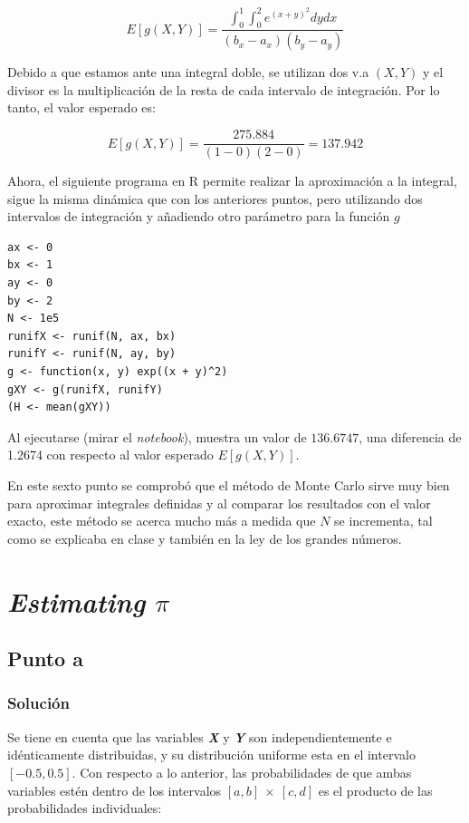 \documentclass[12pt]{article}
\begin{document}
\[
E[g(X, Y)] = \frac{\int_{0}^{1} \int_{0}^{2} e^{(x + y)^{2}} dydx}{(b_{x} - a_{x}) (b_{y} - a_{y})}
\]

Debido a que estamos ante una integral doble, se utilizan dos v.a $(X, Y)$ y el divisor es la multiplicación de la resta de cada intervalo de integración. Por lo tanto, el valor esperado es:

\[
E[g(X, Y)] = \frac{275.884}{(1 - 0) (2 - 0)} = 137.942
\]

Ahora, el siguiente programa en \textsf{R} permite realizar la aproximación a la integral, sigue la misma dinámica que con los anteriores puntos, pero utilizando dos intervalos de integración y añadiendo otro parámetro para la función $g$

\begin{lstlisting}
ax <- 0
bx <- 1
ay <- 0
by <- 2
N <- 1e5
runifX <- runif(N, ax, bx)
runifY <- runif(N, ay, by)
g <- function(x, y) exp((x + y)^2)
gXY <- g(runifX, runifY)
(H <- mean(gXY))
\end{lstlisting}

Al ejecutarse (mirar el \textit{notebook}), muestra un valor de $136.6747$, una diferencia de 1.2674 con respecto al valor esperado $E[g(X, Y)]$.

En este sexto punto se comprobó que el método de Monte Carlo sirve muy bien para aproximar integrales definidas y al comparar los resultados con el valor exacto, este método se acerca mucho más a medida que $N$ se incrementa, tal como se explicaba en clase y también en la ley de los grandes números.





\section{\textit{Estimating} \(\pi\)}

\subsection{Punto a}
\subsubsection{Solución}

Se tiene en cuenta que las variables \textit{\textbf{X}} y \textit{\textbf{Y}} son independientemente e idénticamente distribuidas, y su distribución uniforme esta en el intervalo $[-0.5, 0.5]$. Con respecto a lo anterior, las probabilidades de que ambas variables estén dentro de los intervalos $[a,b]\ \times\ [c,d]$ es el producto de las probabilidades individuales:
\end{document}
